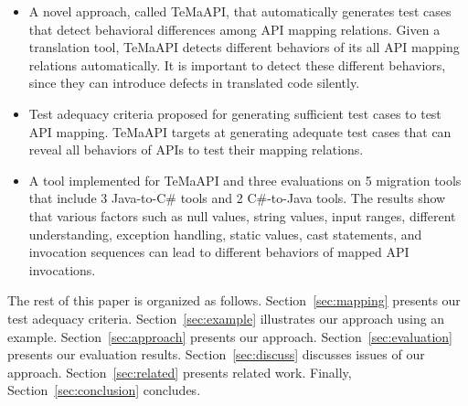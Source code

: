 \begin{itemize}\vspace*{-1.5ex}
\item A novel approach, called TeMaAPI, that automatically generates test cases that detect behavioral differences among API mapping relations. Given a translation tool, TeMaAPI detects different behaviors of its all API mapping relations automatically. It is important to detect these different behaviors, since they can introduce defects in translated code silently.\vspace*{-1.5ex}
\item Test adequacy criteria proposed for generating sufficient test cases to test API mapping. TeMaAPI targets at generating adequate test cases that can reveal all behaviors of APIs to test their mapping relations.\vspace*{-1.5ex}
\item A tool implemented for TeMaAPI and three evaluations on 5 migration tools that include 3 Java-to-C\# tools and 2 C\#-to-Java tools. The results show that various factors such as null values, string values, input ranges, different understanding, exception handling, static values, cast statements, and invocation sequences can lead to different behaviors of mapped API invocations.
\end{itemize}\vspace*{-1.5ex}

The rest of this paper is organized as follows.
Section~\ref{sec:mapping} presents our test adequacy criteria.
Section~\ref{sec:example} illustrates our approach using an example.
Section~\ref{sec:approach} presents our approach.
Section~\ref{sec:evaluation} presents our evaluation results.
Section~\ref{sec:discuss} discusses issues of our approach.
Section~\ref{sec:related} presents related work.
Finally, Section~\ref{sec:conclusion} concludes.



